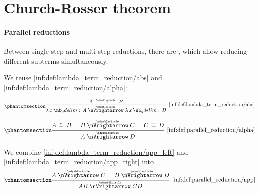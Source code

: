 \section{Church-Rosser theorem}\label{sec:church_rosser_theorem}

\paragraph{Parallel reductions}

\begin{definition}\label{def:parallel_reduction}
  Between single-step and multi-step reductions, there are , which allow reducing different subterms simultaneously.

  \begin{thmenum}
     We reuse \ref{inf:def:lambda_term_reduction/abs} and \ref{inf:def:lambda_term_reduction/alpha}:
    \begin{paracol}{2}
      \begin{leftcolumn}
        \begin{equation*}\taglabel[\ensuremath{ \logic{ParAbs}_{\Anon} }]{inf:def:parallel_reduction/abs}
          \begin{prooftree}
            \hypo{ A \pred B }
            \infer1[\ref{inf:def:lambda_term_reduction/abs}]{ \qabs x A \ppred \qabs x B }
          \end{prooftree}
        \end{equation*}
      \end{leftcolumn}

      \begin{rightcolumn}
        \begin{equation*}\taglabel[\ensuremath{ \logic{ParAlpha}_{\Anon} }]{inf:def:parallel_reduction/alpha}
          \begin{prooftree}
            \hypo{ A \aequiv B }
            \hypo{ B \ppred C }
            \hypo{ C \aequiv D }
            \infer3[\ref{inf:def:parallel_reduction/alpha}]{ A \ppred D }.
          \end{prooftree}
        \end{equation*}
      \end{rightcolumn}
    \end{paracol}

    We combine \ref{inf:def:lambda_term_reduction/app_left} and \ref{inf:def:lambda_term_reduction/app_right} into
    \begin{equation*}\taglabel[\ensuremath{ \logic{ParApp}_{\Anon} }]{inf:def:parallel_reduction/app}
      \begin{prooftree}
        \hypo{ A \ppred C }
        \hypo{ B \ppred D }
        \infer2[\ref{inf:def:parallel_reduction/app}]{ AB \ppred CD }
      \end{prooftree}
    \end{equation*}


\end{thmenum}
\end{definition}
